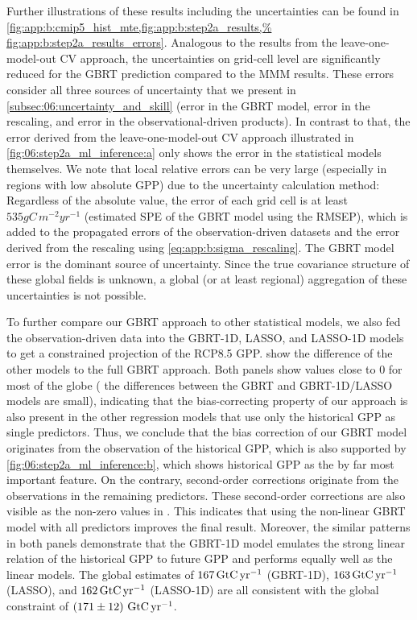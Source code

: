 Further illustrations of these results including the uncertainties can be found
in \cref{fig:app:b:cmip5_hist_mte,fig:app:b:step2a_results,%
  fig:app:b:step2a_results_errors}. Analogous to the results from the
leave-one-model-out \ac{CV} approach, the uncertainties on grid-cell level
are significantly reduced for the \ac{GBRT} prediction compared to the
\ac{MMM} results. These errors consider all three sources of uncertainty that
we present in \cref{subsec:06:uncertainty_and_skill} (error in the \ac{GBRT}
model, error in the rescaling, and error in the observational-driven
products). In contrast to that, the error derived from the
leave-one-model-out \ac{CV} approach illustrated in
\cref{fig:06:step2a_ml_inference:a} only shows the error in the statistical
models themselves. We note that local relative errors can be very large
(especially in regions with low absolute \ac{GPP}) due to the uncertainty
calculation method: Regardless of the absolute value, the error of each grid
cell is at least $535 \unit{gC \, m^{-2} yr^{-1}}$ (estimated \ac{SPE} of the
\ac{GBRT} model using the \ac{RMSEP}), which is added to the propagated
errors of the observation-driven datasets and the error derived from the
rescaling using \cref{eq:app:b:sigma_rescaling}. The \ac{GBRT} model error is
the dominant source of uncertainty. Since the true covariance structure of
these global fields is unknown, a global (or at least regional) aggregation
of these uncertainties is not possible.

To further compare our \ac{GBRT} approach to other statistical models, we also
fed the observation-driven data into the \acs{GBRT}-1D, \ac{LASSO}, and
\acs{LASSO}-1D models to get a constrained projection of the \acs{RCP}8.5
\ac{GPP}. 
show the difference of the other models to the full \ac{GBRT} approach. Both
panels show values close to $0$ for most of the globe (\ie{} the differences
between the \ac{GBRT} and \acs{GBRT}-1D/\ac{LASSO} models are small),
indicating that the bias-correcting property of our approach is also present in
the other regression models that use only the historical \ac{GPP} as single
predictors. Thus, we conclude that the bias correction of our \ac{GBRT} model
originates from the observation of the historical \ac{GPP}, which is also
supported by \cref{fig:06:step2a_ml_inference:b}, which shows historical
\ac{GPP} as the by far most important feature. On the contrary, second-order
corrections originate from the observations in the remaining predictors. These
second-order corrections are also visible as the non-zero values in
. This
indicates that using the non-linear \ac{GBRT} model with all predictors
improves the final result. Moreover, the similar patterns in both panels
demonstrate that the \acs{GBRT}-1D model emulates the strong linear relation of
the historical \ac{GPP} to future \ac{GPP} and performs equally well as the
linear models. The global estimates of $167 \unit{\GtCyr{}}$ (\acs{GBRT}-1D),
$163 \unit{\GtCyr{}}$ (\ac{LASSO}), and $162 \unit{\GtCyr{}}$ (\acs{LASSO}-1D)
are all consistent with the global constraint of
$\pmrangeunit{171}{12}{\GtCyr{}}$.


